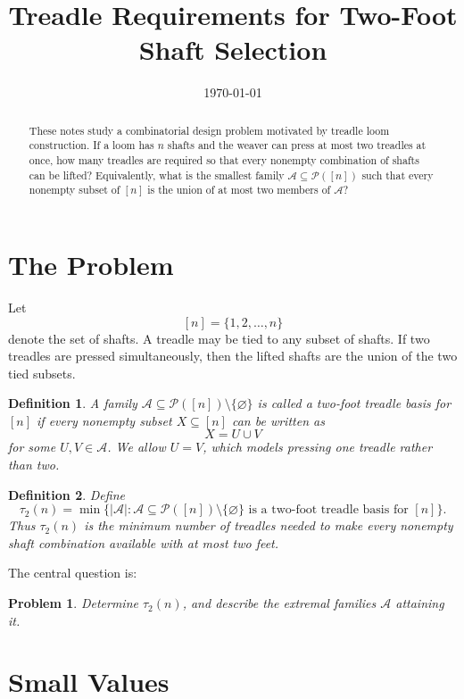 \documentclass[11pt]{article}
\title{Treadle Requirements for Two-Foot Shaft Selection}
\author{}
\date{\today}
\newtheorem{definition}{Definition}
\newtheorem{problem}{Problem}
\newcommand{\pow}{\mathcal{P}}
\newcommand{\A}{\mathcal{A}}
\begin{document}
\maketitle

\begin{abstract}
These notes study a combinatorial design problem motivated by treadle loom
construction. If a loom has \(n\) shafts and the weaver can press at most two
treadles at once, how many treadles are required so that every nonempty
combination of shafts can be lifted? Equivalently, what is the smallest family
\(\A \subseteq \pow([n])\) such that every nonempty subset of \([n]\) is the
union of at most two members of \(\A\)?
\end{abstract}

\section{The Problem}

Let
\[
  [n] = \{1,2,\ldots,n\}
\]
denote the set of shafts. A treadle may be tied to any subset of shafts. If two
treadles are pressed simultaneously, then the lifted shafts are the union of
the two tied subsets.

\begin{definition}
  A family \(\A \subseteq \pow([n])\setminus\{\varnothing\}\) is called a
  \emph{two-foot treadle basis} for \([n]\) if every nonempty subset
  \(X \subseteq [n]\) can be written as
  \[
    X = U \cup V
  \]
  for some \(U,V \in \A\). We allow \(U=V\), which models pressing one treadle
  rather than two.
\end{definition}

\begin{definition}
  Define
  \[
    \tau_2(n)
    =
    \min\bigl\{|\A| : \A \subseteq \pow([n])\setminus\{\varnothing\}
    \text{ is a two-foot treadle basis for } [n]\bigr\}.
  \]
  Thus \(\tau_2(n)\) is the minimum number of treadles needed to make every
  nonempty shaft combination available with at most two feet.
\end{definition}

The central question is:

\begin{problem}
  Determine \(\tau_2(n)\), and describe the extremal families \(\A\) attaining
  it.
\end{problem}

\section{Small Values}
\end{document}
